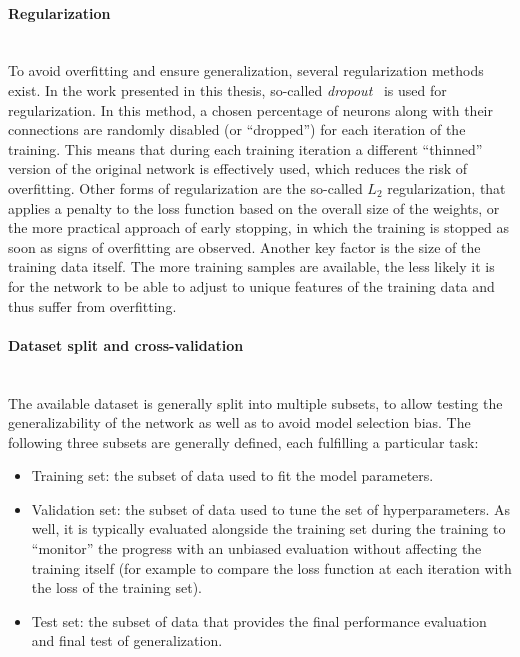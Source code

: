 \paragraph{Regularization}\mbox{}\\
To avoid overfitting and ensure generalization, several regularization methods exist. 
In the work presented in this thesis, so-called \emph{dropout}~\cite{srivastava_dropout_2014,DBLP:journals/corr/abs-1207-0580} is used for regularization. In this method, a chosen percentage of neurons along with their connections are randomly disabled (or ``dropped'') for each iteration of the training. This means that during each training iteration a different ``thinned'' version of the original network is effectively used, which reduces the risk of overfitting. 
Other forms of regularization are the so-called $L_2$ regularization, that applies a penalty to the loss function based on the overall size of the weights, or the more practical approach of early stopping, in which the training is stopped as soon as signs of overfitting are observed. 
Another key factor is the size of the training data itself. The more training samples are available, the less likely it is for the network to be able to adjust to unique features of the training data and thus suffer from overfitting.


\paragraph{Dataset split and cross-validation}\mbox{}\\
The available dataset is generally split into multiple subsets, to allow testing the generalizability of the network as well as to avoid model selection bias.
The following three subsets are generally defined, each fulfilling a particular task:
\begin{itemize}
    \item Training set: the subset of data used to fit the model parameters.
    \item Validation set: the subset of data used to tune the set of hyperparameters. As well, it is typically evaluated alongside the training set during the training to ``monitor'' the progress with an unbiased evaluation without affecting the training itself (for example to compare the loss function at each iteration with the loss of the training set). 
    \item Test set: the subset of data that provides the final performance evaluation and final test of generalization. 
\end{itemize}


